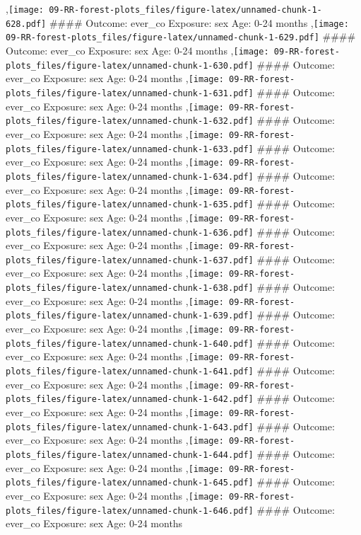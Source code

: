 \documentclass[
  9pt,
]{book}
\begin{document}
,\texttt{[image: 09-RR-forest-plots\_files/figure-latex/unnamed-chunk-1-628.pdf]}
\#\#\#\# Outcome: ever\_co Exposure: sex Age: 0-24 months
,\texttt{[image: 09-RR-forest-plots\_files/figure-latex/unnamed-chunk-1-629.pdf]}
\#\#\#\# Outcome: ever\_co Exposure: sex Age: 0-24 months
,\texttt{[image: 09-RR-forest-plots\_files/figure-latex/unnamed-chunk-1-630.pdf]}
\#\#\#\# Outcome: ever\_co Exposure: sex Age: 0-24 months
,\texttt{[image: 09-RR-forest-plots\_files/figure-latex/unnamed-chunk-1-631.pdf]}
\#\#\#\# Outcome: ever\_co Exposure: sex Age: 0-24 months
,\texttt{[image: 09-RR-forest-plots\_files/figure-latex/unnamed-chunk-1-632.pdf]}
\#\#\#\# Outcome: ever\_co Exposure: sex Age: 0-24 months
,\texttt{[image: 09-RR-forest-plots\_files/figure-latex/unnamed-chunk-1-633.pdf]}
\#\#\#\# Outcome: ever\_co Exposure: sex Age: 0-24 months
,\texttt{[image: 09-RR-forest-plots\_files/figure-latex/unnamed-chunk-1-634.pdf]}
\#\#\#\# Outcome: ever\_co Exposure: sex Age: 0-24 months
,\texttt{[image: 09-RR-forest-plots\_files/figure-latex/unnamed-chunk-1-635.pdf]}
\#\#\#\# Outcome: ever\_co Exposure: sex Age: 0-24 months
,\texttt{[image: 09-RR-forest-plots\_files/figure-latex/unnamed-chunk-1-636.pdf]}
\#\#\#\# Outcome: ever\_co Exposure: sex Age: 0-24 months
,\texttt{[image: 09-RR-forest-plots\_files/figure-latex/unnamed-chunk-1-637.pdf]}
\#\#\#\# Outcome: ever\_co Exposure: sex Age: 0-24 months
,\texttt{[image: 09-RR-forest-plots\_files/figure-latex/unnamed-chunk-1-638.pdf]}
\#\#\#\# Outcome: ever\_co Exposure: sex Age: 0-24 months
,\texttt{[image: 09-RR-forest-plots\_files/figure-latex/unnamed-chunk-1-639.pdf]}
\#\#\#\# Outcome: ever\_co Exposure: sex Age: 0-24 months
,\texttt{[image: 09-RR-forest-plots\_files/figure-latex/unnamed-chunk-1-640.pdf]}
\#\#\#\# Outcome: ever\_co Exposure: sex Age: 0-24 months
,\texttt{[image: 09-RR-forest-plots\_files/figure-latex/unnamed-chunk-1-641.pdf]}
\#\#\#\# Outcome: ever\_co Exposure: sex Age: 0-24 months
,\texttt{[image: 09-RR-forest-plots\_files/figure-latex/unnamed-chunk-1-642.pdf]}
\#\#\#\# Outcome: ever\_co Exposure: sex Age: 0-24 months
,\texttt{[image: 09-RR-forest-plots\_files/figure-latex/unnamed-chunk-1-643.pdf]}
\#\#\#\# Outcome: ever\_co Exposure: sex Age: 0-24 months
,\texttt{[image: 09-RR-forest-plots\_files/figure-latex/unnamed-chunk-1-644.pdf]}
\#\#\#\# Outcome: ever\_co Exposure: sex Age: 0-24 months
,\texttt{[image: 09-RR-forest-plots\_files/figure-latex/unnamed-chunk-1-645.pdf]}
\#\#\#\# Outcome: ever\_co Exposure: sex Age: 0-24 months
,\texttt{[image: 09-RR-forest-plots\_files/figure-latex/unnamed-chunk-1-646.pdf]}
\#\#\#\# Outcome: ever\_co Exposure: sex Age: 0-24 months
\end{document}
